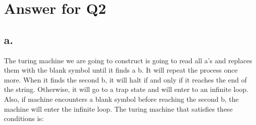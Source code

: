 \documentclass[12pt]{article}
\begin{document}
\section*{Answer for Q2}

\subsection*{a.} 

The turing machine we are going to construct is going to read all a's and replaces them with the blank symbol until it finds a b. It will repeat the process once more. When it finds the second b, it will halt if and only if it reaches the end of the string. Otherwise, it will go to a trap state and will enter to an infinite loop. Also, if machine encounters a blank symbol before reaching the second b, the machine will enter the infinite loop. The turing machine that satisfies these conditions is:\\
\end{document}
